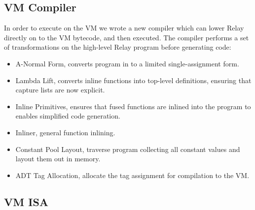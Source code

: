 \subsection{VM Compiler}

In order to execute on the VM we wrote a new compiler which
  can lower Relay directly on to the VM bytecode, and then
  executed.
The compiler performs a set of transformations on the high-level
  Relay program before generating code:
\begin{itemize}
  \item A-Normal Form, converts program in to a limited single-assignment form.
  \item Lambda Lift, converts inline functions into top-level definitions,
        ensuring that capture lists are now explicit.
  \item Inline Primitives, ensures that fused functions are inlined into
        the program to enables simplified code generation.
  \item Inliner, general function inlining.
  \item Constant Pool Layout, traverse program collecting all constant values
        and layout them out in memory.
  \item ADT Tag Allocation, allocate the tag assignment for compilation
        to the VM.
\end{itemize}


\subsection{VM ISA}


